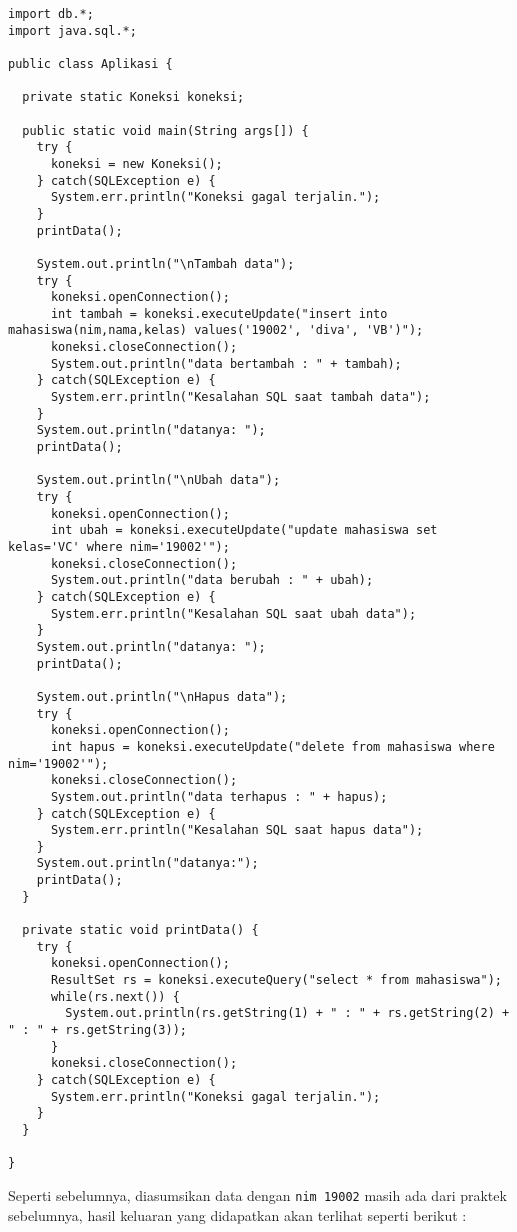 \begin{lstlisting}
import db.*;
import java.sql.*;

public class Aplikasi {

  private static Koneksi koneksi;
  
  public static void main(String args[]) {
    try {
      koneksi = new Koneksi();
    } catch(SQLException e) {
      System.err.println("Koneksi gagal terjalin.");
    }
    printData();
    
    System.out.println("\nTambah data");
    try {
      koneksi.openConnection();
      int tambah = koneksi.executeUpdate("insert into mahasiswa(nim,nama,kelas) values('19002', 'diva', 'VB')");
      koneksi.closeConnection();
      System.out.println("data bertambah : " + tambah);
    } catch(SQLException e) {
      System.err.println("Kesalahan SQL saat tambah data");
    }
    System.out.println("datanya: ");
    printData();
    
    System.out.println("\nUbah data");
    try {
      koneksi.openConnection();
      int ubah = koneksi.executeUpdate("update mahasiswa set kelas='VC' where nim='19002'");
      koneksi.closeConnection();
      System.out.println("data berubah : " + ubah);
    } catch(SQLException e) {
      System.err.println("Kesalahan SQL saat ubah data");
    }
    System.out.println("datanya: ");
    printData();
    
    System.out.println("\nHapus data");
    try {
      koneksi.openConnection();
      int hapus = koneksi.executeUpdate("delete from mahasiswa where nim='19002'");
      koneksi.closeConnection();
      System.out.println("data terhapus : " + hapus);
    } catch(SQLException e) {
      System.err.println("Kesalahan SQL saat hapus data");
    }
    System.out.println("datanya:");
    printData();
  }
  
  private static void printData() {
    try {
      koneksi.openConnection();
      ResultSet rs = koneksi.executeQuery("select * from mahasiswa");
      while(rs.next()) {
        System.out.println(rs.getString(1) + " : " + rs.getString(2) + " : " + rs.getString(3));
      }
      koneksi.closeConnection();
    } catch(SQLException e) {
      System.err.println("Koneksi gagal terjalin.");
    }
  }
  
}
\end{lstlisting}

Seperti sebelumnya, diasumsikan data dengan \texttt{nim 19002} masih ada dari praktek sebelumnya, hasil keluaran yang didapatkan akan terlihat seperti berikut :

